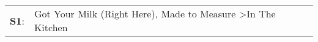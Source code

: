 \begin{supertabular}{p{0.03\textwidth}p{0.92\textwidth}}
 \textbf{S1}:  &  Got Your Milk (Right Here)\textsuperscript{}, \enspace Made to Measure\textsuperscript{} \textgreater \enspace In The Kitchen\textsuperscript{}  \enspace  \\
\end{supertabular}

